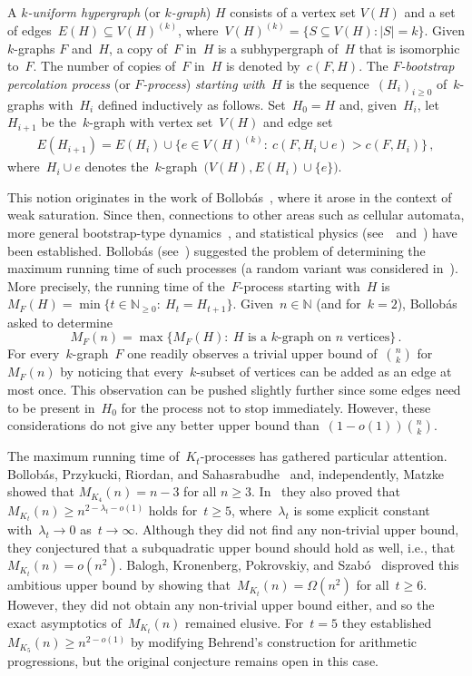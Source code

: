 \documentclass[reqno, 12pt]{amsart}
\numberwithin{equation}{section}
\numberwithin{figure}{section}
\theoremstyle{plain}
\theoremstyle{note}
\theoremstyle{remark}
\begin{document}
	A \emph{$k$-uniform hypergraph} (or \emph{$k$-graph}) $H$ consists of a vertex set $V(H)$ and a set of edges~$E(H) \subseteq V(H)^{(k)}$, where~$V(H)^{(k)} = \{ S \subseteq V(H) : |S| = k \}$.
	Given $k$-graphs $F$ and~$H$, a copy of~$F$ in~$H$ is a subhypergraph of~$H$ that is isomorphic to~$F$.
    The number of copies of~$F$ in~$H$ is denoted by~$c(F,H)$.
    The \emph{$F$-bootstrap percolation process} (or \emph{$F$-process}) \emph{starting with}~$H$ is the sequence~$(H_i)_{i\geq0}$ of~$k$-graphs with~$H_i$ defined inductively as follows.
    Set~$H_0=H$ and, given~$H_i$, let~$H_{i+1}$ be the~$k$-graph with vertex set~$V(H)$ and edge set
    \begin{align*}
		E(H_{i+1})=E(H_i)\cup\big\{e\in V(H)^{(k)}:\: c(F,H_i\cup e)>c(F,H_i)\big\}\,,
	\end{align*}
    where~$H_i\cup e$ denotes the~$k$-graph~$\big(V(H),E(H_i)\cup\{e\}\big)$.

    This notion originates in the work of Bollob\'as~\cite{B:68}, where it arose in the context of weak saturation.
    Since then, connections to other areas such as cellular automata, more general bootstrap-type dynamics~\cite{M:17}, and statistical physics (see~\cite{BBM:12}~and~\cite{CLR:79}) have been established.
    Bollob\'as (see~\cite{BPRS:17}) suggested the problem of determining the maximum running time of such processes (a random variant was considered in~\cite{GKP:17}).
    More precisely, the running time of the~$F$-process starting with~$H$ is~$M_F(H)=\min\{t\in\mathbb{N}_{\geq0}:\:H_t = H_{t + 1}\}$.
    Given~$n\in\mathds{N}$ (and for~$k=2$), Bollob\'as asked to determine
	\[
	M_F(n) = \max \big\{ M_F(H) :\: H \text{ is a } k\text{-graph on } n \text{ vertices} \big\}\,.
	\]
    For every~$k$-graph~$F$ one readily observes a trivial upper bound of~$\binom{n}{k}$ for~$M_F(n)$ by noticing that every~$k$-subset of vertices can be added as an edge at most once.
    This observation can be pushed slightly further since some edges need to be present in~$H_0$ for the process not to stop immediately.
    However, these considerations do not give any better upper bound than~$(1-o(1))\binom{n}{k}$.
    
    The maximum running time of~$K_t$-processes has gathered particular attention. 
    Bollob\'as, Przykucki, Riordan, and Sahasrabudhe~\cite{BPRS:17} and, independently, Matzke~\cite{M:15} showed that $M_{K_4}(n)=n-3$ for all $n\ge 3$. 
    In~\cite{BPRS:17} they also proved that~$M_{K_t}(n)\ge n^{2-\lambda_t-o(1)}$ holds for~$t\ge 5$, where~$\lambda_t$ is some explicit constant with~$\lambda_t\rightarrow 0$ as~$t\rightarrow \infty$.
    Although they did not find any non-trivial upper bound, they conjectured that a subquadratic upper bound should hold as well, i.e., that~$M_{K_t}(n)=o(n^2)$.
    Balogh, Kronenberg, Pokrovskiy, and Szab\'o~\cite{BKPS:26} disproved this ambitious upper bound by showing that~$M_{K_t}(n)=\Omega(n^2)$ for all~$t\ge 6$.
    However, they did not obtain any non-trivial upper bound either, and so the exact asymptotics of~$M_{K_t}(n)$ remained elusive.
    For~$t=5$ they established~$M_{K_5}(n)\geq n^{2-o(1)}$ by modifying Behrend's construction for arithmetic progressions, but the original conjecture remains open in this case.
\end{document}
